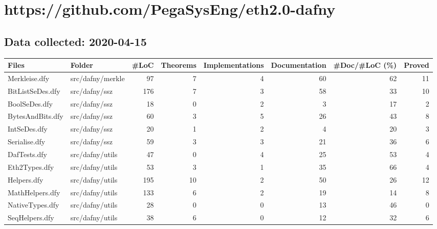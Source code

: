 \documentclass[a4paper, 12pt]{article}
\begin{document}
\section*{https://github.com/PegaSysEng/eth2.0-dafny}
\subsection*{Data collected: 2020-04-15}
\scriptsize
\begin{tabular}{llrrrrrr}
\toprule
                  Files &             Folder &  \#LoC &  Theorems &  Implementations &  Documentation &  \#Doc/\#LoC (\%) &  Proved \\
\midrule
          Merkleise.dfy &   src/dafny/merkle &    97 &         7 &                4 &             60 &             62 &      11 \\
       BitListSeDes.dfy &      src/dafny/ssz &   176 &         7 &                3 &             58 &             33 &      10 \\
          BoolSeDes.dfy &      src/dafny/ssz &    18 &         0 &                2 &              3 &             17 &       2 \\
       BytesAndBits.dfy &      src/dafny/ssz &    60 &         3 &                5 &             26 &             43 &       8 \\
           IntSeDes.dfy &      src/dafny/ssz &    20 &         1 &                2 &              4 &             20 &       3 \\
          Serialise.dfy &      src/dafny/ssz &    59 &         3 &                3 &             21 &             36 &       6 \\
           DafTests.dfy &    src/dafny/utils &    47 &         0 &                4 &             25 &             53 &       4 \\
          Eth2Types.dfy &    src/dafny/utils &    53 &         3 &                1 &             35 &             66 &       4 \\
            Helpers.dfy &    src/dafny/utils &   195 &        10 &                2 &             50 &             26 &      12 \\
        MathHelpers.dfy &    src/dafny/utils &   133 &         6 &                2 &             19 &             14 &       8 \\
        NativeTypes.dfy &    src/dafny/utils &    28 &         0 &                0 &             13 &             46 &       0 \\
         SeqHelpers.dfy &    src/dafny/utils &    38 &         6 &                0 &             12 &             32 &       6 \\

\end{tabular}
\end{document}
